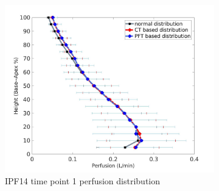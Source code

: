 \begin{figure}[htbp]
\begin{subfigure}{.6\linewidth}
  \includegraphics[width=\linewidth,trim={{.0\wd0} {.0\wd0} {.0\wd0} {.0\wd0}},clip]{Appendix/Image_AppexB/IPF1401/IPF1401_PerfusionAgainstLungHeight.jpg}
  \caption{IPF14 time point 1 perfusion distribution}
  \label{fig:IPF1401VQDistribution-b}
\end{subfigure}
\begin{subfigure}{.6\linewidth}%

\end{subfigure}
\end{figure}

